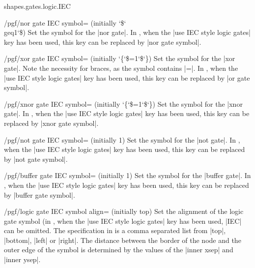\begin{pgflibrary}{shapes.gates.logic.IEC}
\begin{key}{/pgf/nor gate IEC symbol= (initially \char`\$\char`\\geq1\char`\$)}
  Set the symbol for the |nor gate|.  
  In \tikzname, when the |use IEC style logic gates| key has been 
  used, this key can be replaced by |nor gate symbol|.
\end{key}

\begin{key}{/pgf/xor gate IEC symbol= (initially \char`\{\char`\$=1\char`\$\char`\})}
  Set the symbol for the |xor gate|. Note the necessity for braces,
  as the symbol contains |=|.
  In \tikzname, when the |use IEC style logic gates| key has been 
  used, this key can be replaced by |or gate symbol|.
\end{key}

\begin{key}{/pgf/xnor gate IEC symbol= (initially  \char`\{\char`\$=1\char`\$\char`\})}
  Set the symbol for the |xnor gate|.  
  In \tikzname, when the |use IEC style logic gates| key has been 
  used, this key can be replaced by |xnor gate symbol|.
\end{key}

\begin{key}{/pgf/not gate IEC symbol= (initially 1)}
  Set the symbol for the |not gate|.  
  In \tikzname, when the |use IEC style logic gates| key has been 
  used, this key can be replaced by |not gate symbol|.
\end{key}

\begin{key}{/pgf/buffer gate IEC symbol= (initially 1)}
  Set the symbol for the |buffer gate|.  
  In \tikzname, when the |use IEC style logic gates| key has been 
  used, this key can be replaced by |buffer gate symbol|.
\end{key}

\begin{key}{/pgf/logic gate IEC symbol align= (initially top)}
  Set the alignment of the logic gate symbol (in \tikzname, when the 
  |use IEC style logic gates| key has been used, |IEC| can be omitted.
  The specification in  is a comma separated list from
  |top|, |bottom|, |left| or |right|. The distance between the border
  of the node and the outer edge of the symbol is determined by the values 
  of the |inner xsep| and |inner ysep|.
  
\begin{codeexample}[]
\end{codeexample} 


\end{key}
\end{pgflibrary}
